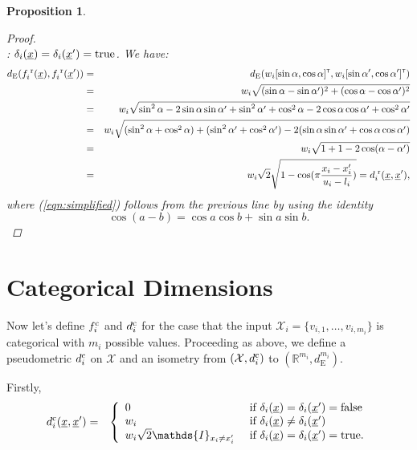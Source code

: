 \documentclass[letterpaper]{article}
\newcommand{\vect}[1]{\underline{\smash{#1}}}
\renewcommand{\v}[1]{\vect{#1}}
\newcommand{\reals}{\mathds{R}}
\newcommand{\sX}{\mathcal{X}}
\newcommand{\br}{^{\text{\textnormal{ r}}}}
\newcommand{\cat}{^{\text{\textnormal{c}}}}
\newcommand\transpose{{\textrm{\tiny{\sf{T}}}}}
\newtheorem{prop}[thm]{Proposition}
\newcommand{\indicator}{\ensuremath\mathds{I}}
\begin{document}
\begin{prop}
\begin{proof}
~\\: $\delta_i(\v{x}) = \delta_i(\v{x}') = \textrm{true}$. We have:
\begin{eqnarray}
\nonumber{}d_{\text{E}}(f_i\br(\v{x}),f_i\br(\v{x}')) & = & d_{\text{E}}(w_i [\sin{\alpha}, \cos{\alpha}]^\transpose, w_i [\sin{\alpha'}, \cos{\alpha'}]^\transpose)\\ 
\nonumber{}& = & w_i \sqrt{(\sin{\alpha}-\sin{\alpha'})^2+ (\cos{\alpha}-\cos{\alpha'})^2}\\
\nonumber{}& = & w_i \sqrt{\sin^2{\alpha} -2 \sin{\alpha}\sin{\alpha'} + \sin^2{\alpha'}  + \cos^2{\alpha} -2 \cos{\alpha}\cos{\alpha'} + \cos^2{\alpha'} }\\
\nonumber{}& = & w_i \sqrt{(\sin^2{\alpha}+\cos^2{\alpha})   +  (\sin^2{\alpha'}+\cos^2{\alpha'})   -2 (\sin{\alpha}\sin{\alpha'} + \cos{\alpha}\cos{\alpha'})}\nonumber\\
& = & w_i \sqrt{ 1+1-2 \cos(\alpha-\alpha')}\nonumber\\
& = & w_i \sqrt{2} \sqrt{1 - \cos(\pi \frac{x_i-x_i'}{u_i-l_i})} = d\br_i(\v{x}, \v{x}'),\label{eqn:simplified}
\end{eqnarray}
where (\ref{eqn:simplified}) follows from the previous line by using the identity 
\[\cos{(a-b)} = \cos{a}\cos{b} + \sin{a}\sin{b}.\]
\end{proof}
\end{prop}






\section{Categorical Dimensions}

Now let's define $f\cat_i$ and $d\cat_i$ for the case that the input $\sX_i=\{v_{i,1}, \dots, v_{i,m_i}\}$ is categorical with $m_i$ possible values. 
Proceeding as above, we define a pseudometric $d\cat_i$ on $\sX$ and an isometry from $(\sX, d\cat_i)$ to $(\reals^{m_i},d_{\text{E}}^{m_i})$. 

Firstly,
\begin{eqnarray}
\nonumber{}d\cat_i(\v{x}, \v{x}') & = & \left\{
\begin{array}{ll}
\nonumber{} 0 & \textrm{ if } \delta_i(\v{x}) = \delta_i(\v{x}') = \textrm{false}\\
\nonumber{} w_i & \textrm{ if } \delta_i(\v{x}) \neq \delta_i(\v{x}')\\
\nonumber{} w_i \sqrt{2} \indicator_{x_i \neq x_i'} 
& \textrm{ if } \delta_i(\v{x}) = \delta_i(\v{x}') = \textrm{true}.
\end{array}
\right.
\end{eqnarray}
\end{document}
